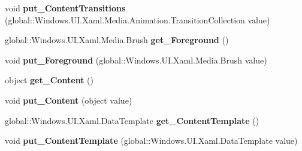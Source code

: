 \begin{DoxyCompactItemize}
\item 
\mbox{\label{interface_windows_1_1_u_i_1_1_xaml_1_1_controls_1_1_i_content_presenter_af8f3017b639541ee85c82042f3186506}} 
void {\bfseries put\+\_\+\+Content\+Transitions} (global\+::\+Windows.\+U\+I.\+Xaml.\+Media.\+Animation.\+Transition\+Collection value)
\item 
\mbox{\label{interface_windows_1_1_u_i_1_1_xaml_1_1_controls_1_1_i_content_presenter_a95c7018f0564a23c7ab641c21ab2cf47}} 
global\+::\+Windows.\+U\+I.\+Xaml.\+Media.\+Brush {\bfseries get\+\_\+\+Foreground} ()
\item 
\mbox{\label{interface_windows_1_1_u_i_1_1_xaml_1_1_controls_1_1_i_content_presenter_a77229ce3c46ba5f9ecb3fbe3361e9c0a}} 
void {\bfseries put\+\_\+\+Foreground} (global\+::\+Windows.\+U\+I.\+Xaml.\+Media.\+Brush value)
\item 
\mbox{\label{interface_windows_1_1_u_i_1_1_xaml_1_1_controls_1_1_i_content_presenter_ae239eb9dcb8ffce9b1af514ec96d232c}} 
object {\bfseries get\+\_\+\+Content} ()
\item 
\mbox{\label{interface_windows_1_1_u_i_1_1_xaml_1_1_controls_1_1_i_content_presenter_a92a8239bd5d9c2deaf3a6901d4c33da6}} 
void {\bfseries put\+\_\+\+Content} (object value)
\item 
\mbox{\label{interface_windows_1_1_u_i_1_1_xaml_1_1_controls_1_1_i_content_presenter_a5ba47cb8cb89765bea45f2242ad31a45}} 
global\+::\+Windows.\+U\+I.\+Xaml.\+Data\+Template {\bfseries get\+\_\+\+Content\+Template} ()
\item 
\mbox{\label{interface_windows_1_1_u_i_1_1_xaml_1_1_controls_1_1_i_content_presenter_a74180212284ee21c083ea156f117cb3c}} 
void {\bfseries put\+\_\+\+Content\+Template} (global\+::\+Windows.\+U\+I.\+Xaml.\+Data\+Template value)

\end{DoxyCompactItemize}
